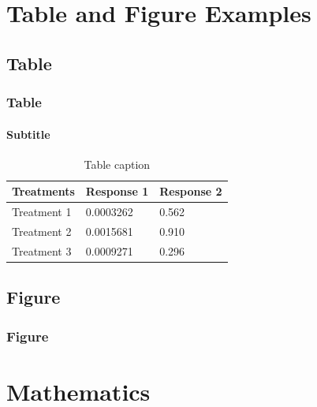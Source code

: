 \documentclass[
11pt, %
]{beamer}
\begin{document}
	
	\section{Table and Figure Examples}
	
	\subsection{Table}
	
	\begin{frame}
		\frametitle{Table}
		\framesubtitle{Subtitle} %
		
		\begin{table}
			\begin{tabular}{l l l}
				\toprule
				\textbf{Treatments} & \textbf{Response 1} & \textbf{Response 2}\\
				\midrule
				Treatment 1 & 0.0003262 & 0.562 \\
				Treatment 2 & 0.0015681 & 0.910 \\
				Treatment 3 & 0.0009271 & 0.296 \\
				\bottomrule
			\end{tabular}
			\caption{Table caption}
		\end{table}
	\end{frame}
	
	
	\subsection{Figure}
	
	\begin{frame}
		\frametitle{Figure}
		

	\end{frame}
	
	
	\section{Mathematics}
	
\end{document}
